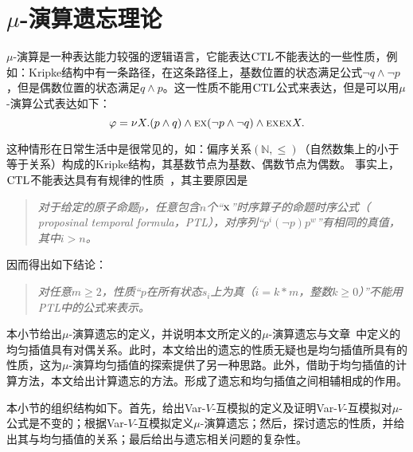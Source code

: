 \section{$\mu$-演算遗忘理论}
\label{chapter03:sec:muforget}
$\mu$-演算是一种表达能力较强的逻辑语言，它能表达$\textrm{CTL}$不能表达的一些性质，例如：Kripke结构中有一条路径，在这条路径上，基数位置的状态满足公式$\neg q \wedge \neg p$，但是偶数位置的状态满足$q \wedge p$。这一性质不能用$\textrm{CTL}$公式来表达，但是可以用$\mu$-演算公式表达如下：
$$\varphi = \nu X.(p \wedge q) \wedge \textsc{e} \textsc{x}(\neg p \wedge \neg q) \wedge \textsc{e} \textsc{x} \textsc{e} \textsc{x} X.$$

这种情形在日常生活中是很常见的，如：偏序关系$(\mathbb{N}, \leq)$（自然数集上的小于等于关系）构成的Kripke结构，其基数节点为基数、偶数节点为偶数。
事实上，$\textrm{CTL}$不能表达具有有规律的性质~\cite{DBLP:journals/iandc/Wolper83}，其主要原因是
\begin{quote}
	\emph{对于给定的原子命题$p$，任意包含$n$个“$\textsc{x}$”时序算子的命题时序公式（ proposinal temporal formula，PTL），对序列“$p^i(\neg p) p^w$”有相同的真值，其中$i > n$。%
	}
\end{quote}

因而得出如下结论：
\begin{quote}
	\emph{对任意$m\geq 2$，性质“$p$在所有状态$s_i$上为真（$i = k*m$，整数$k\geq 0$）”不能用PTL中的公式来表示。
	}
\end{quote}





本小节给出$\mu$-演算遗忘的定义，并说明本文所定义的$\mu$-演算遗忘与文章~\cite{d2006modal}中定义的均匀插值具有对偶关系。此时，本文给出的遗忘的性质无疑也是均匀插值所具有的性质，这为$\mu$-演算均匀插值的探索提供了另一种思路。此外，借助于均匀插值的计算方法，本文给出计算遗忘的方法。形成了遗忘和均匀插值之间相辅相成的作用。

本小节的组织结构如下。首先，给出Var-$V$-互模拟的定义及证明Var-$V$-互模拟对$\mu$-公式是不变的；根据Var-$V$-互模拟定义$\mu$-演算遗忘；然后，探讨遗忘的性质，并给出其与均匀插值的关系；最后给出与遗忘相关问题的复杂性。

